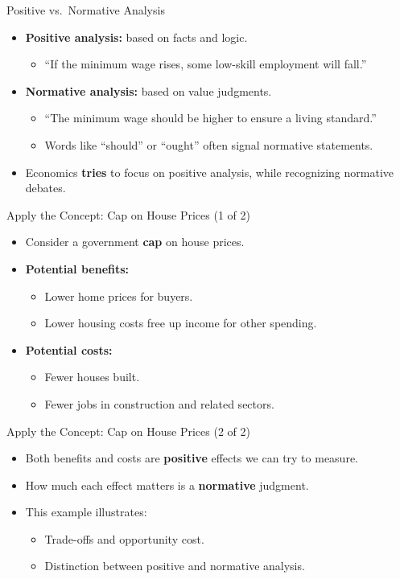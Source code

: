 \documentclass[aspectratio=169]{beamer}
\begin{document}
\begin{frame}{Positive vs.\ Normative Analysis}
\transfade
\begin{itemize}
  \item \textbf{Positive analysis:} based on facts and logic.
  \begin{itemize}
    \item ``If the minimum wage rises, some low-skill employment will fall.''
  \end{itemize}
  \item \textbf{Normative analysis:} based on value judgments.
  \begin{itemize}
    \item ``The minimum wage should be higher to ensure a living standard.''
    \item Words like ``should'' or ``ought'' often signal normative statements.
  \end{itemize}
  \item Economics \textbf{tries} to focus on positive analysis, while recognizing normative debates.
\end{itemize}
\end{frame}

\begin{frame}{Apply the Concept: Cap on House Prices (1 of 2)}
\transfade
\begin{itemize}
  \item Consider a government \textbf{cap} on house prices.
  \item \textbf{Potential benefits:}
  \begin{itemize}
    \item Lower home prices for buyers.
    \item Lower housing costs free up income for other spending.
  \end{itemize}
  \item \textbf{Potential costs:}
  \begin{itemize}
    \item Fewer houses built.
    \item Fewer jobs in construction and related sectors.
  \end{itemize}
\end{itemize}
\end{frame}

\begin{frame}{Apply the Concept: Cap on House Prices (2 of 2)}
\transfade
\begin{itemize}
  \item Both benefits and costs are \textbf{positive} effects we can try to measure.
  \item How much each effect matters is a \textbf{normative} judgment.
  \item This example illustrates:
  \begin{itemize}
    \item Trade-offs and opportunity cost.
    \item Distinction between positive and normative analysis.
  \end{itemize}
\end{itemize}
\end{frame}
\end{document}
